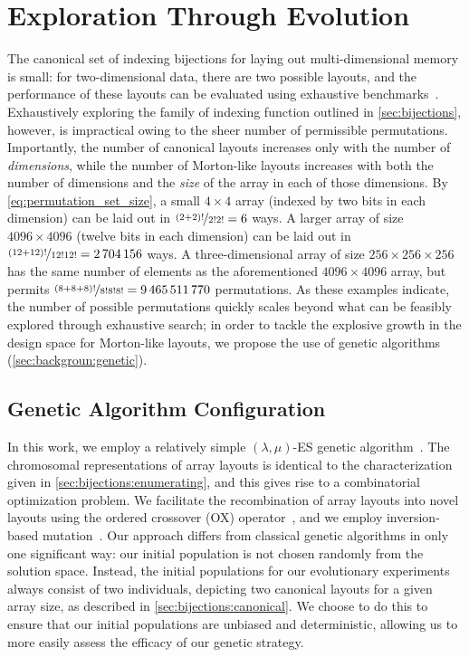 \section{Exploration Through Evolution}

\label{sec:exploration}

The canonical set of indexing bijections for laying out multi-di\-men\-sion\-al memory is small: for two-dimensional data, there are two possible layouts, and the performance of these layouts can be evaluated using exhaustive benchmarks~\cite{10.1145/3578244.3583723,10.1002/cpe.1018,814600}. Exhaustively exploring the family of indexing function outlined in \cref{sec:bijections}, however, is impractical owing to the sheer number of permissible permutations. Importantly, the number of canonical layouts increases only with the number of \emph{dimensions}, while the number of Morton-like layouts increases with both the number of dimensions and the \emph{size} of the array in each of those dimensions. By \cref{eq:permutation_set_size}, a small $4 \times 4$ array (indexed by two bits in each dimension) can be laid out in $\nicefrac{(2+2)!}{2!2!} = 6$ ways. A larger array of size $\num{4096} \times \num{4096}$ (twelve bits in each dimension) can be laid out in $\nicefrac{(12+12)!}{12!12!} = \num{2704156}$ ways. A three-dimensional array of size $256 \times 256 \times 256$ has the same number of elements as the aforementioned $\num{4096} \times \num{4096}$ array, but permits $\nicefrac{(8+8+8)!}{8!8!8!} = \num{9465511770}$ permutations. As these examples indicate, the number of possible permutations quickly scales beyond what can be feasibly explored through exhaustive search; in order to tackle the explosive growth in the design space for Morton-like layouts, we propose the use of genetic algorithms (\cref{sec:backgroun:genetic}).

\subsection{Genetic Algorithm Configuration}
In this work, we employ a relatively simple $(\lambda, \mu)$-ES genetic algorithm~\cite{holland1992adaptation,Slowik2020}. The chromosomal representations of array layouts is identical to the characterization given in \cref{sec:bijections:enumerating}, and this gives rise to a combinatorial optimization problem. We facilitate the recombination of array layouts into novel layouts using the ordered crossover (OX) operator~\cite{10.5555/1625135.1625164}, and we employ inversion-based mutation~\cite{Eiben2015}. Our approach differs from classical genetic algorithms in only one significant way: our initial population is not chosen randomly from the solution space. Instead, the initial populations for our evolutionary experiments always consist of two individuals, depicting two canonical layouts for a given array size, as described in \cref{sec:bijections:canonical}. We choose to do this to ensure that our initial populations are unbiased and deterministic, allowing us to more easily assess the efficacy of our genetic strategy.

